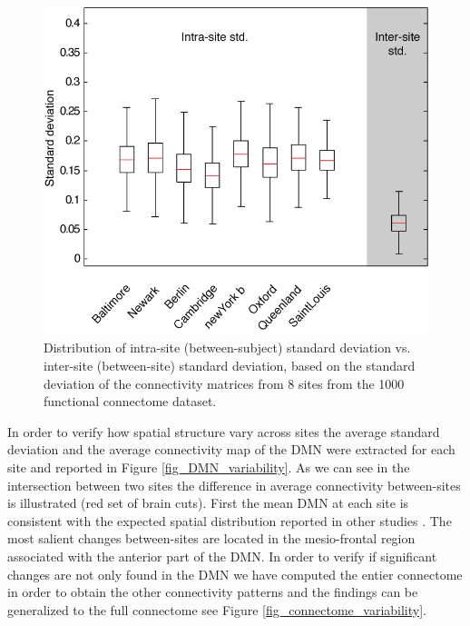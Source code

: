 \documentclass[authoryear]{elsarticle}
\begin{document}
\begin{figure}[tbp]
\begin{center}
\includegraphics[width=\linewidth]{../figures/inter_vs_intra_3tonly.png}
\end{center}
\caption[inter vs. intra site variability]{
  Distribution of intra-site (between-subject) standard deviation vs. inter-site (between-site) standard deviation, based on the standard deviation of the connectivity matrices from 8 sites from the 1000 functional connectome dataset.
}
\label{fig_site_variability}
\end{figure}

In order to verify how spatial structure vary across sites the average standard deviation and the average connectivity map of the DMN were extracted for each site and reported in Figure \ref{fig_DMN_variability}. As we can see in the intersection between two sites the difference in average connectivity between-sites is illustrated (red set of brain cuts). First the mean DMN at each site is consistent with the expected spatial distribution reported in other studies \citep{Damoiseaux2006,Dansereau2014,Yan2013a}. The most salient changes between-sites are located in the mesio-frontal region associated with the anterior part of the DMN. In order to verify if significant changes are not only found in the DMN we have computed the entier connectome in order to obtain the other connectivity patterns and the findings can be generalized to the full connectome see Figure \ref{fig_connectome_variability}.
\end{document}
